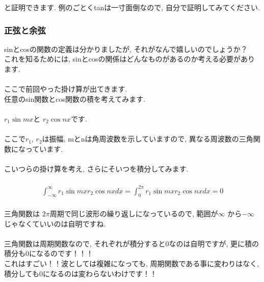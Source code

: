 \documentclass[11pt,a4paper]{jsarticle}
\begin{document}
と証明できます. 例のごとくtanは一寸面倒なので, 自分で証明してみてください.
\subsubsection{正弦と余弦}
sinとcosの関数の定義は分かりましたが, それがなんで嬉しいのでしょうか？\\
これを知るためには, sinとcosの関係はどんなものがあるのか考える必要があります.\\
\\
ここで前回やった掛け算が出てきます. \\
任意のsin関数とcos関数の積を考えてみます.\\
\\
$r_1\sin mx $と $r_2\cos nx $です.\\
\\
ここで$r_1$, $r_2$は振幅, mとnは角周波数を示していますので, 異なる周波数の三角関数になっています.\\
\\
こいつらの掛け算を考え, さらにそいつを積分してみます.\\
\\
\begin{eqnarray}
  \int^\infty_{-\infty} r_1\sin mx r_2\cos nx dx = \int^{2\pi}_0 r_1\sin mx r_2\cos nx dx = 0
\end{eqnarray}
\\
三角関数は $2\pi$周期で同じ波形の繰り返しになっているので, 範囲が$\infty$ から$-\infty$じゃなくていいのは自明ですね.\\
\\
三角関数は周期関数なので, それぞれが積分すると0なのは自明ですが, 更に積の積分も0になるのです！！！\\
これはすごい！！波としては複雑になっても, 周期関数である事に変わりはなく, 積分しても0になるのは変わらないわけです！！\\
\end{document}
